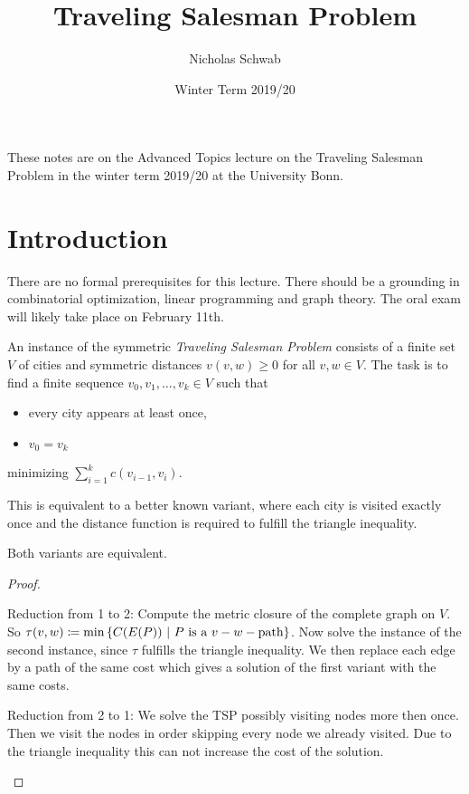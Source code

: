 \documentclass{skript}
\title{Traveling Salesman Problem}
\author{Nicholas Schwab}
\date{Winter Term 2019/20}
\begin{document}
\thispagestyle{plain}
These notes are on the Advanced Topics lecture on the Traveling Salesman Problem in the winter term 2019/20 at the University Bonn.

\tableofcontents

\chapter{Introduction}
There are no formal prerequisites for this lecture.
There should be a grounding in combinatorial optimization, linear programming and graph theory.
The oral exam will likely take place on February 11th.

\begin{definition}
    An instance of the symmetric \emph{Traveling Salesman Problem} consists of a finite set $V$ of cities and symmetric distances $v(v,w) \geq 0$ for all $v,w\in V$.
    The task is to find a finite sequence $v_0,v_1, \dots, v_k\in V$ such that
    \begin{itemize}
        \item 
            every city appears at least once,
        \item 
            $v_0 = v_k$
    \end{itemize}
    minimizing $\sum_{i=1}^k c(v_{i-1}, v_i)$.
\end{definition}

This is equivalent to a better known variant, where each city is visited exactly once and the distance function is required to fulfill the triangle inequality.

\begin{lemma}
    Both variants are equivalent.
\end{lemma}
\begin{proof}
    \begin{description}
        \item{Reduction from 1 to 2:} Compute the metric closure of the complete graph on $V$.
    So $\tau(v,w) \coloneqq \min\left\{C(E(P)) \ \middle|\  P \text{ is a } v-w-\text{path}\right\}$. 
    Now solve the instance of the second instance, since $\tau$ fulfills the triangle inequality. 
    We then replace each edge by a path of the same cost which gives a solution of the first variant with the same costs.
\item{Reduction from 2 to 1:} We solve the TSP possibly visiting nodes more then once.
    Then we visit the nodes in order skipping every node we already visited.
    Due to the triangle inequality this can not increase the cost of the solution.
    \end{description}
\end{proof}
\end{document}
